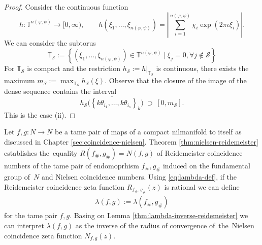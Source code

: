 \documentclass[12pt, a4paper]{amsart}
\begin{document}
\begin{proof}
  Consider the continuous function
  \[
    h: \mathbb{T}^{n(\varphi, \psi)} \to [0, \infty), \qquad
    h(\xi_1, \dots, \xi_{n(\varphi, \psi)}) = \left| \sum_{i=1}^{n(\varphi, \psi)} \chi_i \exp(2\pi\iota \xi_i) \right|.
  \]
  We can consider the subtorus
  \[
    \mathbb{T}_{\mathcal{S}} := \left\{ (\xi_1, \dots, \xi_{n(\varphi, \psi)})
      \in \mathbb{T}^{n(\varphi, \psi)} \mid \xi_j = 0, \forall j \notin \mathcal{S} \right\}
  \]
  For $\mathbb{T}_{\mathcal{S}}$ is compact and the restriction
  $h_\mathcal{S} := \left. h \right|_{\mathbb{T}_\mathcal{S}}$
  is continuous, there exists the maximum $m_\mathcal{S} := \max_{\mathbb{T}_{\mathcal{S}}} h_\mathcal{S}(\xi)$.
  Observe that the closure of the image of the dense sequence contains the interval
  \[
    \overline{h_\mathcal{S}\big( \left\{ k\theta_{i_1}, \dots, k\theta_{i_s} \right\}_k \big)}
    \ \supset \ [0, m_\mathcal{S}].
  \]
  This is the case (ii).
\end{proof}

Let $f,g: N \to N$ be a tame pair of maps of a compact nilmanifold to itself
as discussed in Chapter \ref{sec:coincidence-nielsen}.
Theorem \ref{thm:nielsen-reidemeister} establishes the~equality
$R(f_\#, g_\#) = N(f,g)$ of Reidemeister coincidence numbers of the tame pair
of endomoprhism $f_\#, g_\#$ induced on the fundamental group of~$N$ and Nielsen coincidence numbers.
Using \eqref{eq:lambda-def}, if the Reidemeister coincidence zeta function $R_{f_\#,g_\#}(z)$
is rational we can define
\begin{align}\label{eq:lambda-nielsen}
  \lambda(f,g) := \lambda(f_\#, g_\#)
\end{align}
for the tame pair $f,g$.
Basing on Lemma \ref{thm:lambda-inverse-reidemeister}
we can interpret $\lambda(f,g)$ as the inverse of the radius of convergence
of~the~Nielsen coincidence zeta function $N_{f,g}(z)$.
\end{document}
